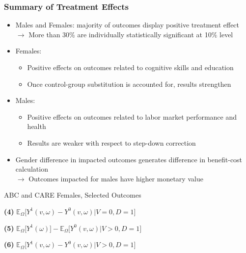 \documentclass[static]{JJH-Beamer}
\newcommand*\leftright[2]{%
  \leavevmode
  \rlap{#1}%
  \hspace{0.5\linewidth}%
  #2}
\begin{document}

\begin{frame}
\frametitle{Summary of Treatment Effects}
\begin{itemize}
	\item Males and Females: majority of outcomes display positive treatment effect 
	$\rightarrow$ More than 30\% are individually statistically significant at 10\% level
	\item Females: 
		\begin{itemize}
			\item Positive effects on outcomes related to cognitive skills and education
			\item Once control-group substitution is accounted for, results strengthen
		\end{itemize}
	\item Males:
		\begin{itemize}
			\item Positive effects on outcomes related to labor market performance and health
			\item Results are weaker with respect to step-down correction
		\end{itemize}
	\item Gender difference in impacted outcomes generates difference in benefit-cost calculation \\
		$\rightarrow$ Outcomes impacted for males have higher monetary value
	\end{itemize}
\end{frame}	


\begin{frame} \label{resultsfemales}
\begin{table}
	\caption{ABC and CARE Females, Selected Outcomes}
	\scalebox{0.7}{}
\end{table}
\begin{tiny}
\leftright{\textbf{(1)} $\mathbb{E}_\Omega \big[ Y^1(\omega) - Y^0(\omega) | D = 1\big]$}{\textbf{(4)} $\mathbb{E}_\Omega \big[ Y^1(v, \omega) - Y^0(v, \omega) | V=0, D = 1 \big] $} \par
\leftright{\textbf{(2)} $\mathbb{E}_\Omega \big[ Y^1(\omega) - Y^0(\omega) |  X, D = 1 \big]$}{\textbf{(5)} $\mathbb{E}_\Omega \big[ Y^1(\omega) \big] - \mathbb{E}_\Omega \big[ Y^0(v, \omega) | V > 0, D =1 \big]$} \par
\leftright{\textbf{(3)} $\mathbb{E}_\Omega \big[ Y^1(\omega) \big] - \mathbb{E}_\Omega \big[ Y^0(v, \omega) | V =0, D =1 \big]$}{\textbf{(6)} $\mathbb{E}_\Omega \big[ Y^1(v, \omega) - Y^0(v, \omega) | V > 0 , D = 1\big]$}

\end{tiny}
\hyperlink{stepdownfemales}{}
\end{frame}
\end{document}

